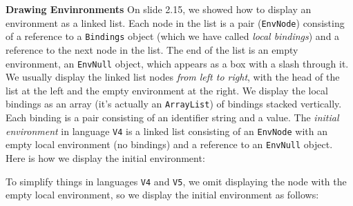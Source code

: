 \begin{minipage}[t]{\sw}
\slidenumber
\LARGE
{\bf Drawing Envinronments}\exx
On slide 2.15, we showed how to display an environment as a linked list.
Each node in the list is a pair (\verb'EnvNode')
consisting of a reference to a \verb'Bindings' object
(which we have called {\em local bindings})
and a reference to the next node in the list.
The end of the list is an empty environment,
an \verb'EnvNull' object,
which appears as a box with a slash through it.
We usually display the linked list nodes {\em from left to right},
with the head of the list at the left
and the empty environment at the right.
We display the local bindings as an array
(it's actually an \verb'ArrayList') of bindings stacked vertically.
Each binding is a pair consisting of an identifier string
and a value.\exx
The {\em initial environment} in language \verb'V4'
is a linked list consisting of an \verb'EnvNode'
with an empty local environment (no bindings)
and a reference to an \verb'EnvNull' object.
Here is how we display the initial environment:
\centerline{}
To simplify things in languages \verb'V4' and \verb'V5',
we omit displaying the node with the empty local environment,
so we display the initial environment as follows:\exx
\centerline{}
\end{minipage}
